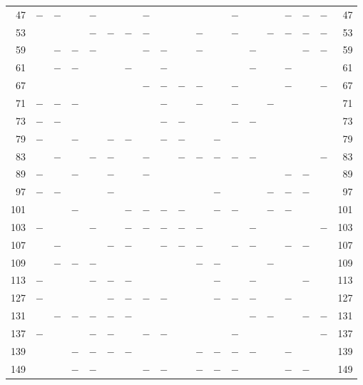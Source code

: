 \begin{center}
\begin{tabular}{r|c|c|c|c|c|c|c|c|c|c|c|c|c|c|c|c|c|r}
47 & $-$ & $-$ &  & $-$ &  &  & $-$ &  &  &  &  & $-$ &  &  & $-$ & $-$ & $-$ & 47\\
53 &  &  &  & $-$ & $-$ & $-$ & $-$ &  &  & $-$ &  & $-$ &  & $-$ & $-$ & $-$ & $-$ & 53\\
59 &  & $-$ & $-$ & $-$ &  &  & $-$ & $-$ &  & $-$ &  &  & $-$ &  &  & $-$ & $-$ & 59\\
61 &  & $-$ & $-$ &  &  & $-$ &  & $-$ &  &  &  &  & $-$ &  & $-$ &  &  & 61\\
67 &  &  &  &  &  &  & $-$ & $-$ & $-$ & $-$ &  & $-$ &  &  & $-$ &  & $-$ & 67\\
71 & $-$ & $-$ & $-$ &  &  &  &  & $-$ &  & $-$ &  & $-$ &  & $-$ &  &  &  & 71\\
73 & $-$ & $-$ &  &  &  &  &  & $-$ & $-$ &  &  & $-$ & $-$ &  &  &  &  & 73\\
79 & $-$ &  & $-$ &  & $-$ & $-$ &  & $-$ & $-$ &  & $-$ &  &  &  &  &  &  & 79\\
83 &  & $-$ &  & $-$ & $-$ &  & $-$ &  & $-$ & $-$ & $-$ & $-$ & $-$ &  &  &  & $-$ & 83\\
89 & $-$ &  & $-$ &  & $-$ &  & $-$ &  &  &  &  &  &  &  & $-$ & $-$ &  & 89\\
97 & $-$ & $-$ &  &  & $-$ &  &  &  &  &  & $-$ &  &  & $-$ & $-$ & $-$ &  & 97\\
101 &  &  & $-$ &  &  & $-$ & $-$ & $-$ & $-$ &  & $-$ & $-$ &  & $-$ & $-$ &  &  & 101\\
103 & $-$ &  &  & $-$ &  & $-$ & $-$ & $-$ & $-$ & $-$ &  &  & $-$ &  &  &  & $-$ & 103\\
107 &  & $-$ &  &  & $-$ & $-$ &  & $-$ & $-$ & $-$ &  & $-$ & $-$ &  & $-$ & $-$ &  & 107\\
109 &  & $-$ & $-$ & $-$ &  &  &  &  &  & $-$ & $-$ &  &  & $-$ &  &  &  & 109\\
113 & $-$ &  &  & $-$ & $-$ & $-$ &  &  &  &  & $-$ &  & $-$ &  &  & $-$ &  & 113\\
127 & $-$ &  &  &  & $-$ & $-$ & $-$ & $-$ &  &  & $-$ & $-$ & $-$ &  & $-$ &  &  & 127\\
131 &  & $-$ & $-$ & $-$ & $-$ & $-$ &  &  &  &  &  &  & $-$ & $-$ &  & $-$ & $-$ & 131\\
137 & $-$ &  &  & $-$ & $-$ &  & $-$ & $-$ &  &  &  & $-$ &  &  &  &  & $-$ & 137\\
139 &  &  & $-$ & $-$ & $-$ & $-$ &  &  &  & $-$ & $-$ & $-$ & $-$ &  & $-$ &  &  & 139\\
149 &  &  & $-$ & $-$ &  &  & $-$ & $-$ &  & $-$ & $-$ & $-$ &  &  & $-$ & $-$ &  & 149\\

\end{tabular}
\end{center}
